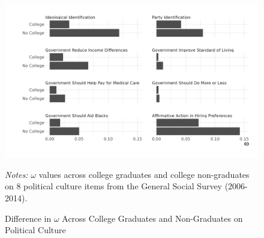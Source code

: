 \documentclass[
  12pt,
]{article}
\begin{document}
\newpage

\begin{figure}[ht]
\caption{Difference in $\omega$ Across College Graduates and Non-Graduates on Political Culture}

\begin{center}\includegraphics[width=450px]{../figures/figure_4_bw} \end{center}

\textit{Notes:} $\omega$ values across college graduates and college non-graduates on 8 political culture items from the General Social Survey (2006-2014).
\end{figure}
\end{document}
